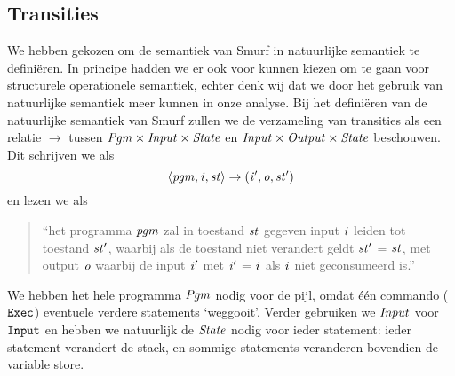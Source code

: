 \subsection{Transities}
\label{sec:def:trans}
We hebben gekozen om de semantiek van Smurf in natuurlijke semantiek te definiëren. In principe hadden we er ook voor kunnen kiezen om te gaan voor structurele operationele semantiek, echter denk wij dat we door het gebruik van natuurlijke semantiek meer kunnen in onze analyse. 
Bij het definiëren van de natuurlijke semantiek van Smurf zullen we de
verzameling van transities als een relatie $\to$ tussen
$\mathit{Pgm}\times\mathit{Input}\times\mathit{State}$ en $\mathit{Input}\times\mathit{Output}\times\mathit{State}$ beschouwen.
Dit schrijven we als
$$\left\langle\mathit{pgm},\mathit{i},\mathit{st}\right\rangle\to\left(\mathit{i}',\mathit{o},\mathit{st}'\right)$$
en lezen we als
\begin{quote}
	``het programma $\mathit{pgm}$ zal in toestand $\mathit{st}$ gegeven input $\mathit{i}$ leiden tot
	toestand $\mathit{st}'$, waarbij als de toestand niet verandert geldt $\mathit{st}'$ = $\mathit{st}$, met output $\mathit{o}$ waarbij de input $\mathit{i}'$ met  $\mathit{i}'$ = $\mathit{i}$ als $\mathit{i}$ niet geconsumeerd is.''
\end{quote}

We hebben het hele programma $\mathit{Pgm}$ nodig voor de pijl, omdat één commando
($\texttt{Exec}$) eventuele verdere statements `weggooit'. %
Verder gebruiken we $\mathit{Input}$ voor $\texttt{Input}$ en hebben we natuurlijk de
$\mathit{State}$ nodig voor ieder statement: ieder statement verandert de stack, en
sommige statements veranderen bovendien de variable store.

